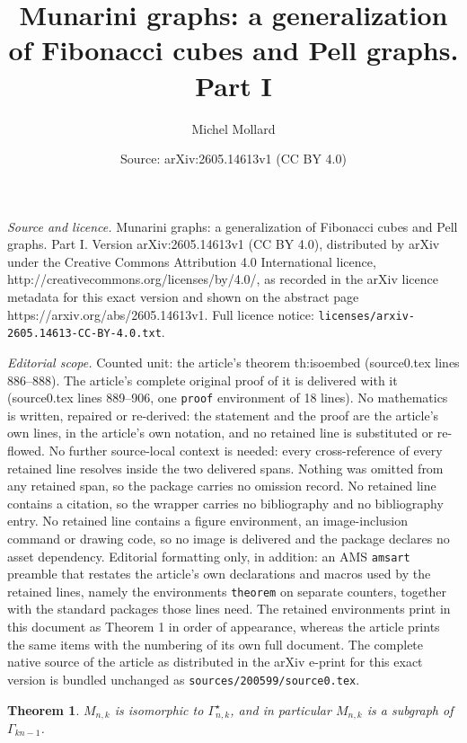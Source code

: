 \documentclass[10pt,a4paper]{amsart}
\title{Munarini graphs: a generalization of Fibonacci cubes and Pell graphs. Part I}
\author{Michel Mollard}
\date{Source: arXiv:2605.14613v1 (CC BY 4.0)}
\newtheorem{theorem}{Theorem}
\begin{document}
\maketitle

\noindent\emph{Source and licence.} Munarini graphs: a generalization of Fibonacci cubes and Pell graphs. Part I. Version arXiv:2605.14613v1 (CC BY 4.0), distributed by arXiv under the Creative Commons Attribution 4.0 International licence, http://creativecommons.org/licenses/by/4.0/, as recorded in the arXiv licence metadata for this exact version and shown on the abstract page https://arxiv.org/abs/2605.14613v1. Full licence notice: \texttt{licenses/arxiv-2605.14613-CC-BY-4.0.txt}.\par\smallskip

\noindent\textit{Editorial scope.} Counted unit: the article's theorem th:isoembed (source0.tex lines 886--888). The article's complete original proof of it is delivered with it (source0.tex lines 889--906, one \texttt{proof} environment of 18 lines). No mathematics is written, repaired or re-derived: the statement and the proof are the article's own lines, in the article's own notation, and no retained line is substituted or re-flowed.  No further source-local context is needed: every cross-reference of every retained line resolves inside the two delivered spans.  Nothing was omitted from any retained span, so the package carries no omission record.  No retained line contains a citation, so the wrapper carries no bibliography and no bibliography entry.  No retained line contains a figure environment, an image-inclusion command or drawing code, so no image is delivered and the package declares no asset dependency.  Editorial formatting only, in addition: an AMS \texttt{amsart} preamble that restates the article's own declarations and macros used by the retained lines, namely the environments \texttt{theorem} on separate counters, together with the standard packages those lines need.  The retained environments print in this document as Theorem 1 in order of appearance, whereas the article prints the same items with the numbering of its own full document.  The complete native source of the article as distributed in the arXiv e-print for this exact version is bundled unchanged as \texttt{sources/200599/source0.tex}.
\begin{theorem}\label{th:isoembed}
$M_{n,k}$ is isomorphic to $\Gamma_{n,k}^\star$, and in particular $M_{n,k}$ is a subgraph of $\Gamma_{kn-1}$.
\end{theorem}
\end{document}
